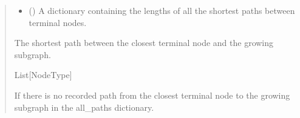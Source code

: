 \documentclass[letterpaper,10pt,english]{sphinxmanual}
\begin{document}
\begin{fulllineitems}
\begin{quote}
\begin{description}
\begin{itemize}
\item {} 
\sphinxAtStartPar
{} () \textendash{} A dictionary containing the lengths of all the shortest paths between terminal nodes.

\end{itemize}

\sphinxAtStartPar
The shortest path between the closest terminal node and the growing subgraph.

\sphinxAtStartPar
List{[}NodeType{]}

\sphinxAtStartPar
{} \textendash{} If there is no recorded path from the closest terminal node to the growing subgraph in the all\_paths dictionary.

\end{description}\end{quote}

\end{fulllineitems}

\end{document}
